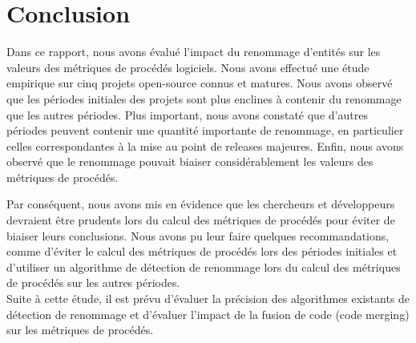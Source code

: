 \section{Conclusion}
\label{sec:conclusion}

Dans ce rapport, nous avons évalué l'impact du renommage d'entités sur les valeurs des métriques de procédés logiciels. Nous avons effectué une étude empirique sur cinq projets open-source connus et matures. Nous avons observé que les périodes initiales des projets sont plus enclines à contenir du renommage que les autres périodes. Plus important, nous avons constaté que d'autres périodes peuvent contenir une quantité importante de renommage, en particulier celles correspondantes à la mise au point de releases majeures. Enfin, nous avons observé que le renommage pouvait biaiser considérablement les valeurs des métriques de procédés. 

Par conséquent, nous avons mis en évidence que les chercheurs et développeurs devraient être prudents lors du calcul des métriques de procédés pour éviter de biaiser leurs conclusions. Nous avons pu leur faire quelques recommandations, comme d’éviter le calcul des métriques de procédés lors des périodes initiales et d’utiliser un algorithme de détection de renommage lors du calcul des métriques de procédés sur les autres périodes.\\

Suite à cette étude, il est prévu d'évaluer la précision des algorithmes existants de détection de renommage et d'évaluer l'impact de la fusion de code (code merging) sur les métriques de procédés.
